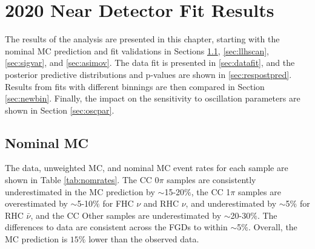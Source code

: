 \chapter{2020 Near Detector Fit Results}\label{sec:2020Fit}

The results of the analysis are presented in this chapter, starting with the nominal MC prediction and fit validations in Sections \ref{sec:nommc}, \ref{sec:llhscan}, \ref{sec:sigvar}, and \ref{sec:asimov}. The data fit is presented in \ref{sec:datafit}, and the posterior predictive distributions and p-values are shown in \ref{sec:respostpred}. Results from fits with different binnings are then compared in Section \ref{sec:newbin}. Finally, the impact on the sensitivity to oscillation parameters are shown in Section \ref{sec:oscpar}.

\section{Nominal MC}\label{sec:nommc}

The data, unweighted MC, and nominal MC event rates for each sample are shown in Table \ref{tab:nomrates}. The CC 0$\pi$ samples are consistently underestimated in the MC prediction by $\sim$15-20$\%$, the CC 1$\pi$ samples are overestimated by $\sim$5-10$\%$ for FHC $\nu$ and RHC $\nu$, and underestimated by $\sim$5$\%$ for RHC $\bar{\nu}$, and the CC Other samples are underestimated by $\sim$20-30$\%$. The differences to data are consistent across the FGDs to within $\sim$5$\%$. Overall, the MC prediction is $15\%$ lower than the observed data.

